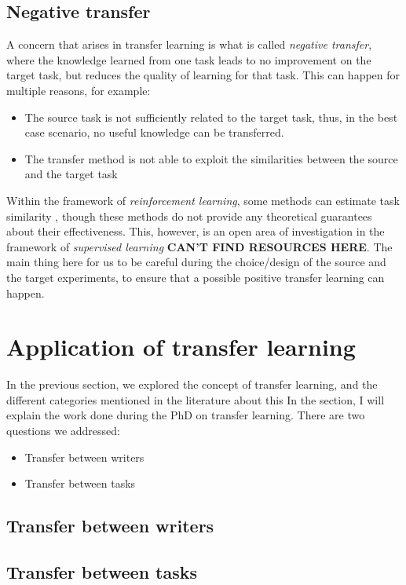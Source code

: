   \subsection{Negative transfer}
  \par A concern that arises in transfer learning is what is called \textit{negative transfer}, where the knowledge learned from one task leads to no improvement on the target task, but reduces the quality of learning for that task. This can happen for multiple reasons, for example:
  \begin{itemize}
      \item The source task is not sufficiently related to the target task, thus, in the best case scenario, no useful knowledge can be transferred.
      \item The transfer method is not able to exploit the similarities between the source and the target task
  \end{itemize}
  Within the framework of \textit{reinforcement learning}, some methods can estimate task similarity \citep{taylor2008transferring, torrey2010transfer}, though these methods do not provide any theoretical guarantees about their effectiveness. This, however, is an open area of investigation in the framework of \textit{supervised learning} \textbf{CAN'T FIND RESOURCES HERE}. The main thing here for us to be careful during the choice/design of the source and the target experiments, to ensure that a possible positive transfer learning can happen.

\section{Application of transfer learning}
  \par In the previous section, we explored the concept of transfer learning, and the different categories mentioned in the literature about this
  In the section, I will explain the work done during the PhD on transfer learning. There are two questions we addressed:
  \begin{itemize}
      \item Transfer between writers
      \item Transfer between tasks
  \end{itemize}

  \subsection{Transfer between writers}
  \subsection{Transfer between tasks}


